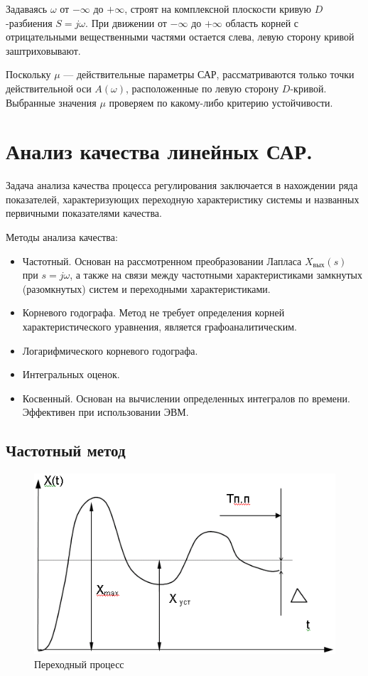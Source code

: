 \documentclass[unicode, 12pt, a4paper, oneside]{article}
\begin{document}
Задаваясь $ \omega $ от $ -\infty $ до $ +\infty $, строят на комплексной плоскости кривую $ D $-разбиения $ S = j\omega $. При движении от $ -\infty $ до $ +\infty $ область корней с отрицательными вещественными частями остается слева, левую сторону кривой заштриховывают.

Поскольку $ \mu $ --- действительные параметры САР, рассматриваются только точки действительной оси $ A(\omega) $, расположенные по левую сторону $ D $-кривой. Выбранные значения $ \mu $ проверяем по какому-либо критерию устойчивости.


\section{Анализ качества линейных САР.}

Задача анализа качества процесса регулирования заключается в нахождении ряда показателей, характеризующих переходную характеристику системы и названных первичными показателями качества.

Методы анализа качества:
\begin{itemize}
\item Частотный. Основан на рассмотренном преобразовании Лапласа $ X_\text{вых}(s) $ при $ s = j\omega $, а также на связи между частотными характеристиками замкнутых (разомкнутых) систем и переходными характеристиками.
\item Корневого годографа. Метод не требует определения корней характеристического уравнения, является графоаналитическим.
\item Логарифмического корневого годографа.
\item Интегральных оценок.
\item Косвенный. Основан на вычислении определенных интегралов по времени. Эффективен при использовании ЭВМ.
\end{itemize}

\subsection*{Частотный метод}

\begin{figure}
\centering
\includegraphics[width=\linewidth]{28_proc.png}
\caption{Переходный процесс}
\end{figure}
\end{document}

